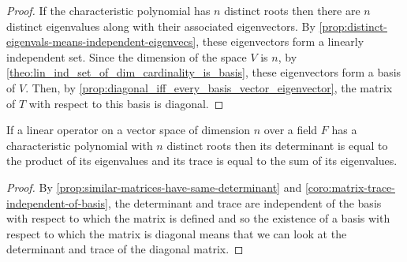 \documentclass[MathsNotesBase.tex]{subfiles}
\begin{document}
{		\bigskip
		\begin{proof}
			If the characteristic polynomial has $n$ distinct roots then there are $n$ distinct eigenvalues along with their associated eigenvectors. By \autoref{prop:distinct-eigenvals-means-independent-eigenvecs}, these eigenvectors form a linearly independent set. Since the dimension of the space $V$ is $n$, by \autoref{theo:lin_ind_set_of_dim_cardinality_is_basis}, these eigenvectors form a basis of $V$. Then, by \autoref{prop:diagonal_iff_every_basis_vector_eigenvector}, the matrix of $T$ with respect to this basis is diagonal.
		\end{proof}
	
		\bigskip{}
		\begin{corollary}
			If a linear operator on a vector space of dimension $n$ over a field $F$ has a characteristic polynomial with $n$ distinct roots then its determinant is equal to the product of its eigenvalues and its trace is equal to the sum of its eigenvalues.
		\end{corollary}
		\begin{proof}
			By \autoref{prop:similar-matrices-have-same-determinant} and \autoref{coro:matrix-trace-independent-of-basis}, the determinant and trace are independent of the basis with respect to which the matrix is defined and so the existence of a basis with respect to which the matrix is diagonal means that we can look at the determinant and trace of the diagonal matrix.
		\end{proof}
	
}
\end{document}
